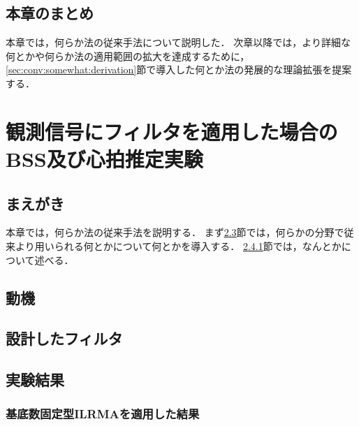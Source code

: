 \section{本章のまとめ}
本章では，何らか法の従来手法について説明した．
次章以降では，より詳細な何とかや何らか法の適用範囲の拡大を達成するために，
\ref{sec:conv:somewhat:derivation}節で導入した何とか法の発展的な理論拡張を提案する．


\chapter{観測信号にフィルタを適用した場合のBSS及び心拍推定実験}
\label{chap:conv}

\section{まえがき}
本章では，何らか法の従来手法を説明する．
まず\ref{sec:conv:something}節では，何らかの分野で従来より用いられる何とかについて何とかを導入する．
\ref{sec:conv:somewhat}節では，なんとかについて述べる．

\section{動機}
\label{sec:conv:something}

\section{設計したフィルタ}
\label{sec:conv:something}

\section{実験結果}
\label{sec:conv:somewhat}

\subsection{基底数固定型ILRMAを適用した結果}
\label{sec:conv:somewhat}

